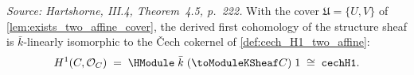 \begin{lemma}
  \label{lem:HModule_H1_iso_cech_two_affine}
  \textit{Source: Hartshorne, III.4, Theorem~4.5, p.~222.}
  With the cover \(\mathfrak U = \{U, V\}\) of
  \cref{lem:exists_two_affine_cover}, the derived first cohomology of
  the structure sheaf is \(\bar k\)-linearly isomorphic to the Čech
  cokernel of \cref{def:cech_H1_two_affine}:
  \[
    H^1(C, \mathcal O_C) \;=\;
    \HModule\;\bar k\;(\toModuleKSheaf C)\;1 \;\cong\; \cechHI .
  \]
\end{lemma}

